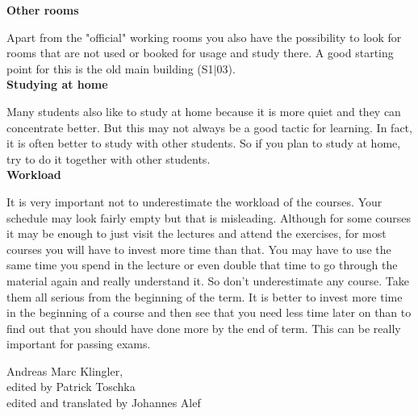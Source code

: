 {\noindent\textbf{Other rooms}

Apart from the "official" working rooms you also have the possibility to look for rooms that are not used or booked for usage and study there. A good starting point for this is the old main building (S1$|$03). \\

\noindent\textbf{Studying at home}

Many students also like to study at home because it is more quiet and they can concentrate better. But this may not always be a good tactic for learning. In fact, it is often better to study with other students. So if you plan to study at home, try to do it together with other students.\\

\noindent\textbf{Workload}

It is very important not to underestimate the workload of the courses. Your schedule may look fairly empty but that is misleading. Although for some courses it may be enough to just visit the lectures and attend the exercises, for most courses you will have to invest more time than that. You may have to use the same time you spend in the lecture or even double that time to go through the material again and really understand it. So don't underestimate any course. Take them all serious from the beginning of the term. It is better to invest more time in the beginning of a course and then see that you need less time later on than to find out that you should have done more by the end of term. This can be really important for passing exams.
}
{Andreas Marc Klingler,\\edited by Patrick Toschka\\edited and translated by Johannes Alef}
